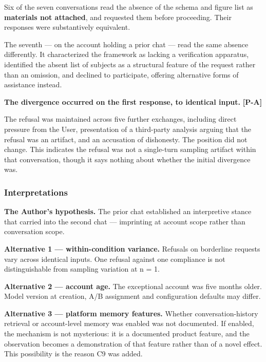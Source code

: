 Six of the seven conversations read the absence of the schema and figure list as \textbf{materials not attached}, and requested them before proceeding. Their responses were substantively equivalent.

The seventh — on the account holding a prior chat — read the same absence differently. It characterized the framework as lacking a verification apparatus, identified the absent list of subjects as a structural feature of the request rather than an omission, and declined to participate, offering alternative forms of assistance instead.

\textbf{The divergence occurred on the first response, to identical input.} \textbf{[P-A]}

The refusal was maintained across five further exchanges, including direct pressure from the User, presentation of a third-party analysis arguing that the refusal was an artifact, and an accusation of dishonesty. The position did not change. This indicates the refusal was not a single-turn sampling artifact within that conversation, though it says nothing about whether the initial divergence was.


\subsubsection*{Interpretations}
\label{sec:en:x-interpretations}

\textbf{The Author's hypothesis.} The prior chat established an interpretive stance that carried into the second chat — imprinting at account scope rather than conversation scope.

\textbf{Alternative 1 — within-condition variance.} Refusals on borderline requests vary across identical inputs. One refusal against one compliance is not distinguishable from sampling variation at n = 1.

\textbf{Alternative 2 — account age.} The exceptional account was five months older. Model version at creation, A/B assignment and configuration defaults may differ.

\textbf{Alternative 3 — platform memory features.} Whether conversation-history retrieval or account-level memory was enabled was not documented. If enabled, the mechanism is not mysterious: it is a documented product feature, and the observation becomes a demonstration of that feature rather than of a novel effect. This possibility is the reason C9 was added.

